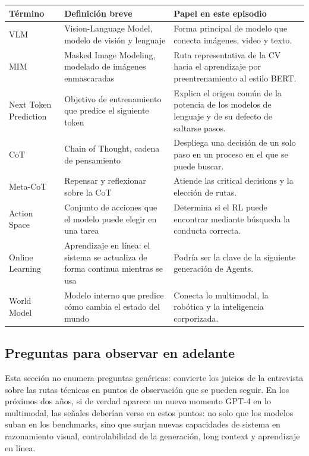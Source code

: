 \noindent\begin{tabularx}{\textwidth}{p{}p{}X}
\toprule
Término & Definición breve & Papel en este episodio \\
\midrule
VLM & Vision-Language Model, modelo de visión y lenguaje & Forma principal de modelo que conecta imágenes, video y texto. \\
MIM & Masked Image Modeling, modelado de imágenes enmascaradas & Ruta representativa de la CV hacia el aprendizaje por preentrenamiento al estilo BERT. \\
Next Token Prediction & Objetivo de entrenamiento que predice el siguiente token & Explica el origen común de la potencia de los modelos de lenguaje y de su defecto de saltarse pasos. \\
CoT & Chain of Thought, cadena de pensamiento & Despliega una decisión de un solo paso en un proceso en el que se puede buscar. \\
Meta-CoT & Repensar y reflexionar sobre la CoT & Atiende las critical decisions y la elección de rutas. \\
Action Space & Conjunto de acciones que el modelo puede elegir en una tarea & Determina si el RL puede encontrar mediante búsqueda la conducta correcta. \\
Online Learning & Aprendizaje en línea: el sistema se actualiza de forma continua mientras se usa & Podría ser la clave de la siguiente generación de Agents. \\
World Model & Modelo interno que predice cómo cambia el estado del mundo & Conecta lo multimodal, la robótica y la inteligencia corporizada. \\
\bottomrule
\end{tabularx}

\subsection{Preguntas para observar en adelante}

Esta sección no enumera preguntas genéricas: convierte los juicios de la entrevista sobre las rutas técnicas en puntos de observación que se pueden seguir. En los próximos dos años, si de verdad aparece un nuevo momento GPT-4 en lo multimodal, las señales deberían verse en estos puntos: no solo que los modelos suban en los benchmarks, sino que surjan nuevas capacidades de sistema en razonamiento visual, controlabilidad de la generación, long context y aprendizaje en línea.

